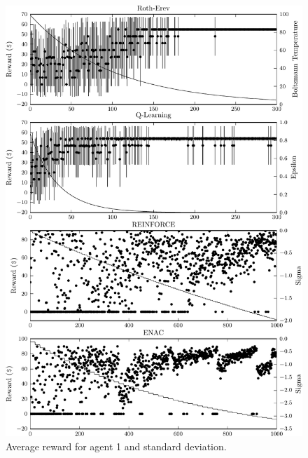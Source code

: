 {\begin{figure}
	  \includegraphics{figures/fig5_2_reward_a1}
	  \caption{Average reward for agent 1 and standard deviation.}
	  \label{fig:5_2_reward_a1}
	\end{figure}
}{}

